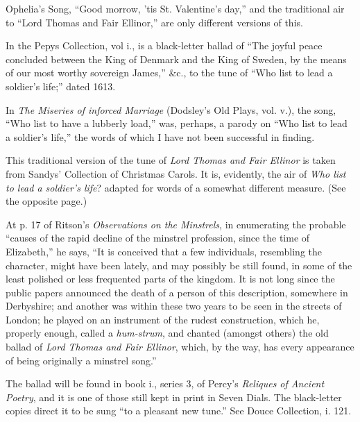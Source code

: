 Ophelia’s Song, “Good morrow, ’tis St. Valentine’s day,” and the traditional
air to “Lord Thomas and Fair Ellinor,” are only different versions of this.

In the Pepys Collection, vol i., is a black-letter ballad of “The joyful peace
concluded between the King of Denmark and the King of Sweden, by the means of
our most worthy sovereign James,” \&c., to the tune of “Who list to lead a
soldier’s life;” dated 1613.

In \textit{The Miseries of inforced Marriage} (Dodsley’s Old Plays, vol. v.), the song,
“Who list to have a lubberly load,” was, perhaps, a parody on “Who list to lead
a soldier’s life,” the words of which I have not been successful in finding.



\pagebreak
{}


This traditional version of the tune of \textit{Lord Thomas and Fair Ellinor} is taken
from Sandys’ Collection of Christmas Carols. It is, evidently, the air of \textit{Who
list to lead a soldier's life}? adapted for words of a somewhat different measure.
(See the opposite page.)

At p. 17 of Ritson’s \textit{Observations on the Minstrels}, in enumerating the probable
“causes of the rapid decline of the minstrel profession, since the time of Elizabeth,”
he says, “It is conceived that a few individuals, resembling the character,
might have been lately, and may possibly be still found, in some of the least
polished or less frequented parts of the kingdom. It is not long since the public
papers announced the death of a person of this description, somewhere in Derbyshire;
and another was within these two years to be seen in the streets of London;
he played on an instrument of the rudest construction, which he, properly enough,
called a \textit{hum-strum}, and chanted (amongst others) the old ballad of \textit{Lord Thomas
and Fair Ellinor}, which, by the way, has every appearance of being originally a
minstrel song.”

The ballad will be found in book i., series 3, of Percy’s \textit{Reliques of Ancient
Poetry}, and it is one of those still kept in print in Seven Dials. The black-letter
copies direct it to be sung “to a pleasant new tune.” See Douce Collection, i. 121.

